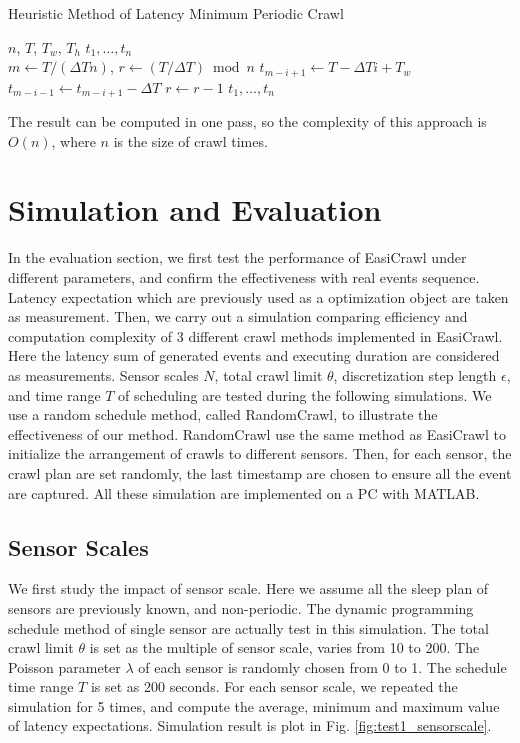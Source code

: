\documentclass[conference]{IEEEtran}
\begin{document}
\begin{algorithm}
\caption{Heuristic Method of Latency Minimum Periodic Crawl}
  \begin{algorithmic}[1]
  \renewcommand{\algorithmicrequire}{\textbf{Input:}}
  \renewcommand{\algorithmicensure}{\textbf{Output:}}
  \REQUIRE $n$, $T$, $T_w$, $T_h$
  \ENSURE  $t_1,\ldots,t_n$
  \\ 
  \STATE $m \gets T/(\Delta T n)$, $r\gets (T/\Delta T)\bmod{n}$
    \STATE $t_{m-i+1}\gets T-\Delta T i + T_w$
    	\STATE $t_{m-i-1}\gets t_{m-i+1}-\Delta T$
        \STATE $r\gets r-1$
    \ENDIF
  \ENDFOR
  \RETURN $t_1,\ldots,t_n$
  \end{algorithmic} 
\end{algorithm}

The result can be computed in one pass, so the complexity of this approach is $O(n)$, where $n$ is the size of crawl times.

\section{Simulation and Evaluation}

In the evaluation section, we first test the performance of EasiCrawl under different parameters, and confirm the effectiveness with real events sequence. Latency expectation which are previously used as a optimization object are taken as measurement.
Then, we carry out a simulation comparing efficiency and computation complexity of 3 different crawl methods implemented in EasiCrawl. Here the latency sum of generated events and executing duration are considered as measurements.
Sensor scales $N$, total crawl limit $\theta$, discretization step length $\epsilon$, and time range $T$ of scheduling are tested during the following simulations. We use a random schedule method, called RandomCrawl, to illustrate the effectiveness of our method. RandomCrawl use the same method as EasiCrawl to initialize the arrangement of crawls to different sensors. Then, for each sensor, the crawl plan are set randomly, the last timestamp are chosen to ensure all the event are captured.
All these simulation are implemented on a PC with MATLAB.

\subsection{Sensor Scales}
We first study the impact of sensor scale. Here we assume all the sleep plan of sensors are previously known, and non-periodic. The dynamic programming schedule method of single sensor are actually test in this simulation. The total crawl limit $\theta$ is set as the multiple of sensor scale, varies from 10 to 200. The Poisson parameter $\lambda$ of each sensor is randomly chosen from 0 to 1. The schedule time range $T$ is set as 200 seconds. For each sensor scale, we repeated the simulation for 5 times, and compute the average, minimum and maximum value of latency expectations. Simulation result is plot in Fig. \ref{fig:test1_sensorscale}.
\end{document}
